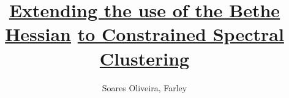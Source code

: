 

% 
\documentclass[a4paper,11pt]{jreport}

\usepackage[dvipdfmx]{graphicx}  
\usepackage{amsmath}
\usepackage{amsfonts}
\usepackage{varioref}
\usepackage[shortlabels]{enumitem}



\DeclareMathOperator{\cut}{cut\,}
\DeclareMathOperator{\spn}{span\,}
\DeclareMathOperator*{\vol}{vol\,}
\DeclareMathOperator*{\ncut}{Ncut\,}
\DeclareMathOperator*{\argmin}{\arg\!\min}



\usepackage[left=25truemm,top=35truemm,right=25truemm,bottom=50truemm]{geometry}
\usepackage{times} %

\setcounter{tocdepth}{3}
\setcounter{page}{-1}

\setlength{\parskip}{0em}
\setlength{\topsep}{0em}


\usepackage{coins-jp-utf8}

\title{\underline{Extending the use of the Bethe Hessian} \underline{to Constrained Spectral Clustering}}
\author{Soares Oliveira, Farley}

